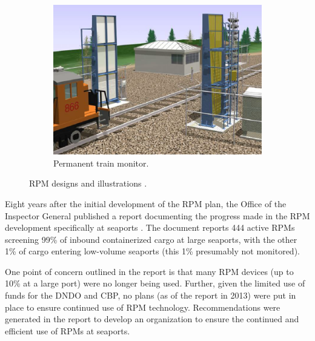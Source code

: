 \documentclass{report}
\begin{document}
\begin{figure}
\begin{subfigure}[b]{0.3\textwidth}
        \end{subfigure}
        ~ %
        \begin{subfigure}[b]{0.3\textwidth}
                \includegraphics[width=\textwidth,scale=1]{./figures/perm_train.png}
                \caption{Permanent train monitor.}
                \label{fig:perm_train}
        \end{subfigure}
        \caption{RPM designs and illustrations \cite{Simmons2005}.}\label{fig:RPM_designs}
\end{figure}
  


Eight years after the initial development of the RPM plan, the Office of the Inspector General published a report documenting the progress made in the RPM development specifically at seaports \cite{DepartmentofHomelandSecurityDHS2013}. The document reports 444 active RPMs screening 99\% of inbound containerized cargo at large seaports, with the other 1\% of cargo entering low-volume seaports (this 1\% presumably not monitored). 


One point of concern outlined in the report is that many RPM devices (up to 10\% at a large port) were no longer being used. Further, given the limited use of funds for the DNDO and CBP, no plans (as of the report in 2013) were put in place to ensure continued use of RPM technology. Recommendations were generated in the report to develop an organization to ensure the continued and efficient use of RPMs at seaports. 
\end{document}
